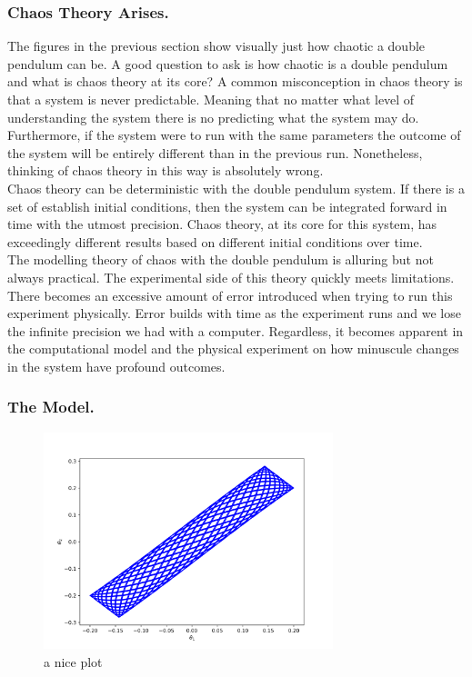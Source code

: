 \documentclass[runningheads]{llncs}
\begin{document}
\subsubsection{Chaos Theory Arises.}

The figures in the previous section show visually just how chaotic a double pendulum can be. A good question to ask is how chaotic is a double pendulum and what is chaos theory at its core? A common misconception in chaos theory is that a system is never predictable. Meaning that no matter what level of understanding the system there is no predicting what the system may do. Furthermore, if the system were to run with the same parameters the outcome of the system will be entirely different than in the previous run. Nonetheless, thinking of chaos theory in this way is absolutely wrong. \\

Chaos theory can be deterministic with the double pendulum system. If there is a set of establish initial conditions, then the system can be integrated forward in time with the utmost precision. Chaos theory, at its core for this system, has exceedingly different results based on different initial conditions over time. \\

The modelling theory of chaos with the double pendulum is alluring but not always practical. The experimental side of this theory quickly meets limitations. There becomes an excessive amount of error introduced when trying to run this experiment physically. Error builds with time as the experiment runs and we lose the infinite precision we had with a computer. Regardless, it becomes apparent in the computational model and the physical experiment on how minuscule changes in the system have profound outcomes. \\

\subsubsection{The Model.}

\begin{figure}[h]
    \centering
    \includegraphics[width=0.75\textwidth]{img/simple_pendulum_thetas_non_chaos.png}
    \caption{a nice plot}
    \label{fig:theta_vs_theta}
\end{figure}
 
\end{document}
